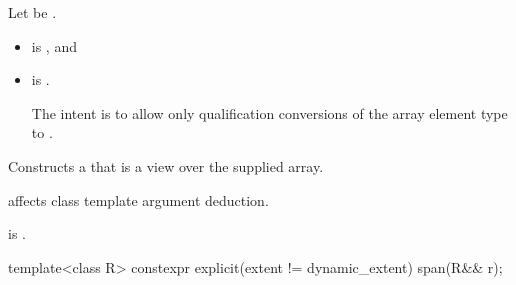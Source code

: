 \begin{itemdescr}
\pnum
\constraints
Let  be .
\begin{itemize}
\item {} is , and
\item {} is .
\begin{note}
The intent is to allow only qualification conversions
of the array element type to .
\end{note}
\end{itemize}

\pnum
\effects
Constructs a  that is a view over the supplied array.
\begin{note}
 affects class template argument deduction.
\end{note}

\pnum
\ensures
{} is .
\end{itemdescr}

%
\begin{itemdecl}
template<class R> constexpr explicit(extent != dynamic_extent) span(R&& r);
\end{itemdecl}

